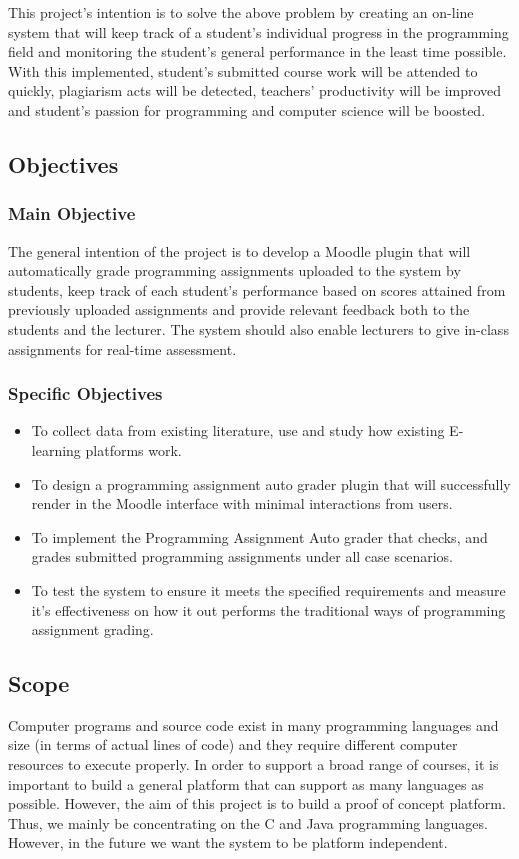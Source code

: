 \documentclass[12pt]{article}
\begin{document}
		\noindent This project's intention is to solve the above problem by creating an on-line system that will keep track of a student's individual progress in the programming field and monitoring the student's general performance in the least time possible. With this implemented, student's submitted course work will be attended to quickly, plagiarism acts will be detected, teachers' productivity will be improved and student's passion for programming and computer science will be boosted.
	\subsection{Objectives}
		\subsubsection{Main Objective}
		The general intention of the project is to develop a Moodle plugin that will automatically grade programming assignments uploaded to the system by students, keep track of each student's performance based on scores attained from previously uploaded assignments and provide relevant feedback both to the students and the lecturer. The system should also enable lecturers to give in-class assignments for real-time assessment.
		\subsubsection{Specific Objectives}
		\begin{itemize}
			\item To collect data from existing literature, use and study how existing E-learning platforms work.
			\item To design a programming assignment auto grader plugin that will successfully render in the Moodle interface with minimal interactions from users.
			\item To implement the Programming Assignment Auto grader that checks, and grades submitted programming assignments under all case scenarios. 
			\item To test the system to ensure it meets the specified requirements and measure it's effectiveness on how it out performs the traditional ways of programming assignment grading.
		\end{itemize}
		
	\subsection{Scope}
		Computer programs and source code exist in many programming languages and size (in terms of actual lines of code) and they require different computer resources to execute properly. In order to support a broad range of courses, it is important to build a general platform that can support as many languages as possible. However, the aim of this project is to build a proof of concept platform. Thus, we mainly be concentrating on the C and Java programming languages.
		However, in the future we want the system to be platform independent. \\
		 
\end{document}
